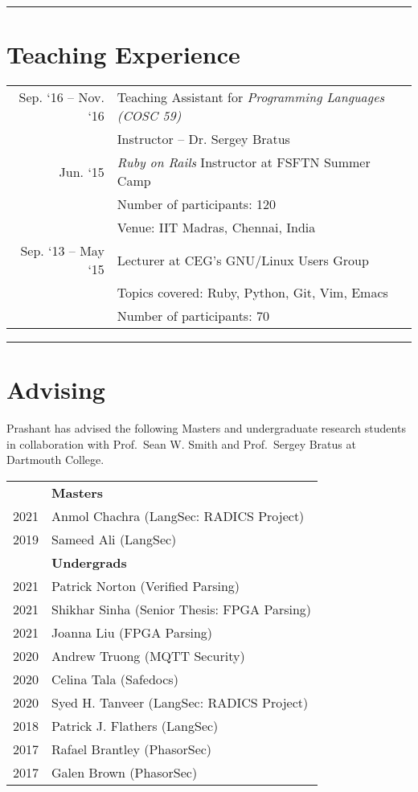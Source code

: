 \documentclass[letterpaper,10pt]{article}
\begin{document}
\hrule
\section*{\color{dartmouthgreen} Teaching Experience}
  \begin{tabular}{r l}
  \setlength\itemsep{0ex}
  Sep. `16 -- Nov. `16 & Teaching Assistant for \textit{Programming Languages (COSC 59)} \\
    &  Instructor -- Dr. Sergey Bratus \\
  Jun. `15 & \textit{Ruby on Rails} Instructor at FSFTN Summer Camp \\
     & Number of participants: 120 \\
     & Venue: IIT Madras, Chennai, India \\
  Sep. `13 -- May `15 & Lecturer at CEG's GNU/Linux Users Group \\
                      & Topics covered: Ruby, Python, Git, Vim, Emacs \\
                      & Number of participants: 70\\
  \end{tabular}


\vspace{0.5cm}
\hrule
\section*{\color{dartmouthgreen} Advising}

  Prashant has advised the following Masters and undergraduate research students in collaboration with Prof.\ Sean W. Smith and Prof.\ Sergey Bratus at Dartmouth College.

  \begin{longtable}[l]{r l}
    & \textbf{Masters} \\
    2021 & Anmol Chachra (LangSec: RADICS Project)\\ 
    2019 & Sameed Ali (LangSec)\\
    & \textbf{Undergrads} \\
    2021 & Patrick Norton (Verified Parsing) \\
    2021 & Shikhar Sinha (Senior Thesis: FPGA Parsing) \\
    2021 & Joanna Liu (FPGA Parsing)\\
    2020 & Andrew Truong (MQTT Security)\\
    2020 & Celina Tala (Safedocs)\\
    2020 & Syed H. Tanveer (LangSec: RADICS Project)\\
    2018 & Patrick J. Flathers (LangSec)\\
    2017 & Rafael Brantley (PhasorSec)\\
    2017 & Galen Brown (PhasorSec)\\
  \end{longtable}
\vspace{0.5cm}
\end{document}
